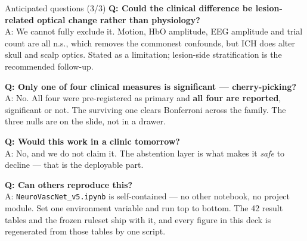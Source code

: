 \documentclass[aspectratio=169,11pt]{beamer}
\begin{document}
\begin{frame}{Anticipated questions (3/3)}
\small
\textbf{Q: Could the clinical difference be lesion-related optical change rather
than physiology?}\\
A: We cannot fully exclude it. Motion, HbO amplitude, EEG amplitude and trial
count are all n.s., which removes the commonest confounds, but ICH does alter
skull and scalp optics. Stated as a limitation; lesion-side stratification is the
recommended follow-up.

\vspace{0.5em}
\textbf{Q: Only one of four clinical measures is significant --- cherry-picking?}\\
A: No. All four were pre-registered as primary and \textbf{all four are
reported}, significant or not. The surviving one clears Bonferroni across the
family. The three nulls are on the slide, not in a drawer.

\vspace{0.5em}
\textbf{Q: Would this work in a clinic tomorrow?}\\
A: No, and we do not claim it. The abstention layer is what makes it \emph{safe}
to decline --- that is the deployable part.

\vspace{0.5em}
\textbf{Q: Can others reproduce this?}\\
A: \texttt{NeuroVascNet\_v5.ipynb} is self-contained --- no other notebook, no
project module. Set one environment variable and run top to bottom. The 42 result
tables and the frozen ruleset ship with it, and every figure in this deck is
regenerated from those tables by one script.
\end{frame}

\end{document}
